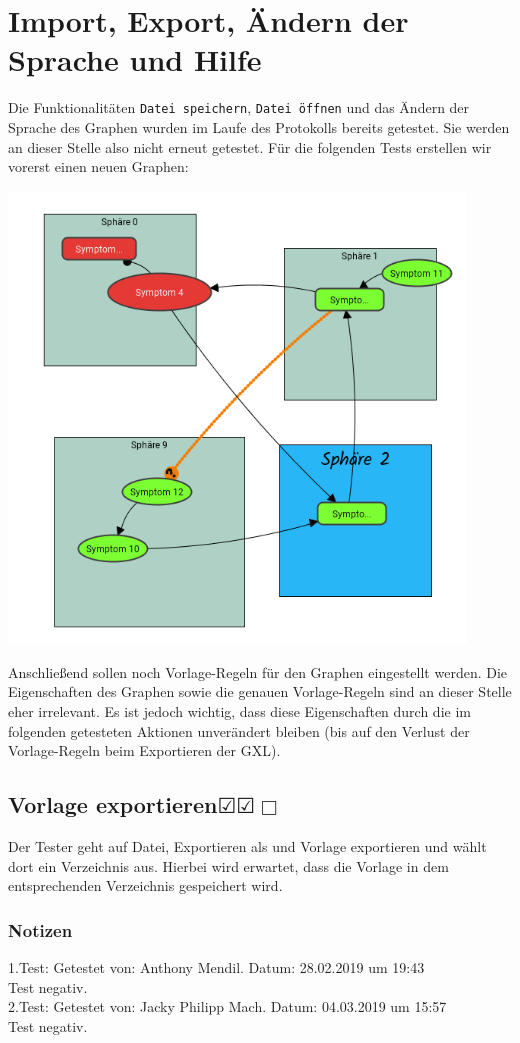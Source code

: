 \documentclass[enabledeprecatedfontcommands]{scrartcl}
\newcommand{\subsectiont}[2]{\subsection[#1]{#1{\normalsize\normalfont #2}}}
\newcommand{\leer}{$\Box$}
\newcommand{\ok}{$\CheckedBox$}
\begin{document}
\section{Import, Export, Ändern der Sprache und Hilfe}
Die Funktionalitäten \texttt{Datei speichern}, \texttt{Datei öffnen} und das Ändern der Sprache des Graphen wurden im Laufe des Protokolls bereits getestet. Sie werden an dieser Stelle also nicht erneut getestet. Für die folgenden Tests erstellen wir vorerst einen neuen Graphen: 
\begin{center}
\includegraphics[height=12cm]{graphfuerExportkram.PNG}
\end{center}
Anschließend sollen noch Vorlage-Regeln für den Graphen eingestellt werden. Die Eigenschaften des Graphen sowie die genauen Vorlage-Regeln sind an dieser Stelle eher irrelevant. Es ist jedoch wichtig, dass diese Eigenschaften durch die im folgenden getesteten Aktionen unverändert bleiben (bis auf den Verlust der Vorlage-Regeln beim Exportieren der GXL). 
\newpage

\subsectiont{Vorlage exportieren}{\dotfill\ok\ok\leer}
Der Tester geht auf Datei, Exportieren als und Vorlage exportieren und wählt dort ein Verzeichnis aus. Hierbei wird erwartet, dass die Vorlage in dem entsprechenden Verzeichnis gespeichert wird.
\subsubsection{Notizen}
1.Test: Getestet von: Anthony Mendil. Datum: 28.02.2019 um 19:43 \\
Test negativ.\\
2.Test: Getestet von: Jacky Philipp Mach. Datum: 04.03.2019 um 15:57 \\
Test negativ.
\end{document}
